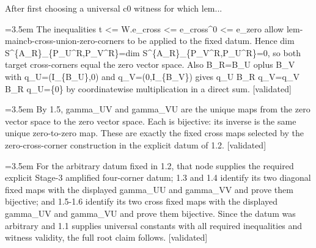 \documentclass{article}
\newcommand{\step}[1]{\par\noindent\hangindent=3.5em\hangafter=1%
  \makebox[3.5em][l]{\textbf{#1.}}}
\newcommand{\steptag}[1]{\hfill{\small\textsf{[#1]}}}
\begin{document}
\begin{proofbox}{After first choosing a universal c0 witness for which lem...}
\step{1.5} The inequalities t <= W.e\_cross <= e\_cross\textasciicircum{}0 <= e\_zero allow lem-maincb-cross-union-zero-corners to be applied to the fixed datum. Hence dim S\textasciicircum{}\{A\_R\}\_\{P\_U\textasciicircum{}R,P\_V\textasciicircum{}R\}=dim S\textasciicircum{}\{A\_R\}\_\{P\_V\textasciicircum{}R,P\_U\textasciicircum{}R\}=0, so both target cross-corners equal the zero vector space. Also B\_R=B\_U oplus B\_V with q\_U=(I\_\{B\_U\},0) and q\_V=(0,I\_\{B\_V\}) gives q\_U B\_R q\_V=q\_V B\_R q\_U=\{0\} by coordinatewise multiplication in a direct sum. \steptag{validated} \\[4pt]
\step{1.6} By 1.5, gamma\_UV and gamma\_VU are the unique maps from the zero vector space to the zero vector space. Each is bijective: its inverse is the same unique zero-to-zero map. These are exactly the fixed cross maps selected by the zero-cross-corner construction in the explicit datum of 1.2. \steptag{validated} \\[4pt]
\step{1.7} For the arbitrary datum fixed in 1.2, that node supplies the required explicit Stage-3 amplified four-corner datum; 1.3 and 1.4 identify its two diagonal fixed maps with the displayed gamma\_UU and gamma\_VV and prove them bijective; and 1.5-1.6 identify its two cross fixed maps with the displayed gamma\_UV and gamma\_VU and prove them bijective. Since the datum was arbitrary and 1.1 supplies universal constants with all required inequalities and witness validity, the full root claim follows. \steptag{validated} \\[4pt]
\end{proofbox}
\end{document}
